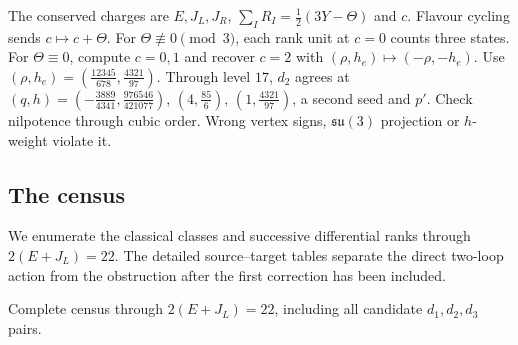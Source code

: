 \documentclass[11pt]{article}
\numberwithin{equation}{section}
\numberwithin{figure}{section}
\numberwithin{table}{section}
\begin{document}
The conserved charges are $E,J_L,J_R$, $\sum_IR_I=\tfrac12(3Y-\Theta)$ and $c$. Flavour cycling sends $c\mapsto c+\Theta$. For $\Theta\not\equiv0\pmod3$, each rank unit at $c=0$ counts three states. For $\Theta\equiv0$, compute $c=0,1$ and recover $c=2$ with $(\rho,h_e)\mapsto(-\rho,-h_e)$. Use $(\rho,h_e)=(\tfrac{12345}{678},\tfrac{4321}{97})$. Through level $17$, $d_2$ agrees at $(q,h)=(-\tfrac{3889}{4341},\tfrac{976546}{421077})$, $(4,\tfrac{85}6)$, $(1,\tfrac{4321}{97})$, a second seed and $p'$. Check nilpotence through cubic order. Wrong vertex signs, $\mathfrak{su}(3)$ projection or $h$-weight violate it.

\subsection{The census}\label{sec-E-LS-census}

We enumerate the classical classes and successive differential ranks through $2(E+J_L)=22$. The detailed source--target tables separate the direct two-loop action from the obstruction after the first correction has been included.

Complete census through $2(E+J_L)=22$, including all candidate $d_1,d_2,d_3$ pairs.
\end{document}
